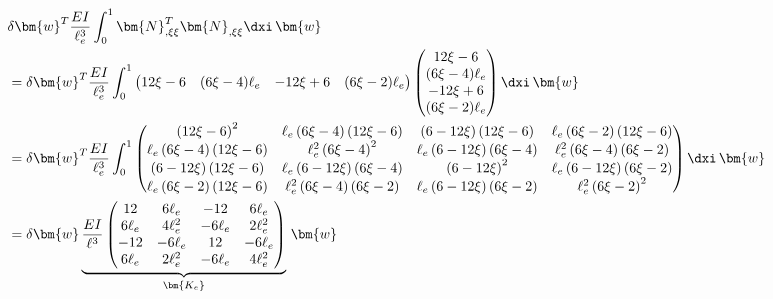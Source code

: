 \documentclass[letterpaper,10pt,german]{jupyterBook}
\begin{document}
\begin{equation}\label{equation:chapters/chapter2/BalkenFEM:Elementsteifigkeit_Balken_01}
\begin{split}\begin{align}
  & \delta \bm{w}^T \frac{EI}{\ell^3_e} \int_0^{1}  \bm{N}_{,\xi\xi}^T \bm{N}_{,\xi\xi} \dxi\, \bm{w} \\
  &= \delta \bm{w}^T \frac{EI}{\ell^3_e} \int_0^{1} \begin{pmatrix}
    12\xi -6 & (6\xi-4)\ell_e  & -12\xi+6 & (6\xi-2)\ell_e 
  \end{pmatrix} \begin{pmatrix}
    12\xi -6 \\
    (6\xi-4)\ell_e  \\
    -12\xi+6 \\
    (6\xi-2)\ell_e 
  \end{pmatrix} \dxi\, \bm{w} \\
  &= \delta \bm{w}^T \frac{EI}{\ell^3_e} \int_0^{1} \begin{pmatrix}\left(12 \xi - 6\right)^{2} & \ell_e \left(6 \xi - 4\right) \left(12 \xi - 6\right) & \left(6 - 12 \xi\right) \left(12 \xi - 6\right) & \ell_e \left(6 \xi - 2\right) \left(12 \xi - 6\right)\\\ell_e \left(6 \xi - 4\right) \left(12 \xi - 6\right) & \ell_e^{2} \left(6 \xi - 4\right)^{2} & \ell_e \left(6 - 12 \xi\right) \left(6 \xi - 4\right) & \ell_e^{2} \left(6 \xi - 4\right) \left(6 \xi - 2\right)\\\left(6 - 12 \xi\right) \left(12 \xi - 6\right) & \ell_e \left(6 - 12 \xi\right) \left(6 \xi - 4\right) & \left(6 - 12 \xi\right)^{2} & \ell_e \left(6 - 12 \xi\right) \left(6 \xi - 2\right)\\\ell_e \left(6 \xi - 2\right) \left(12 \xi - 6\right) & \ell_e^{2} \left(6 \xi - 4\right) \left(6 \xi - 2\right) & \ell_e \left(6 - 12 \xi\right) \left(6 \xi - 2\right) & \ell_e^{2} \left(6 \xi - 2\right)^{2}\end{pmatrix} \dxi\, \bm{w} \\
  &= \delta \bm{w} \underbrace{\frac{EI}{\ell^3} \begin{pmatrix}12 & 6 \ell_e & -12 & 6 \ell_e\\6 \ell_e & 4 \ell_e^{2} & - 6 \ell_e & 2 \ell_e^{2}\\-12 & - 6 \ell_e & 12 & - 6 \ell_e\\6 \ell_e & 2 \ell_e^{2} & - 6 \ell_e & 4 \ell_e^{2}\end{pmatrix}}_{\bm{K_e}} \,  \bm{w}
\end{align}\end{split}
\end{equation}
\end{document}

